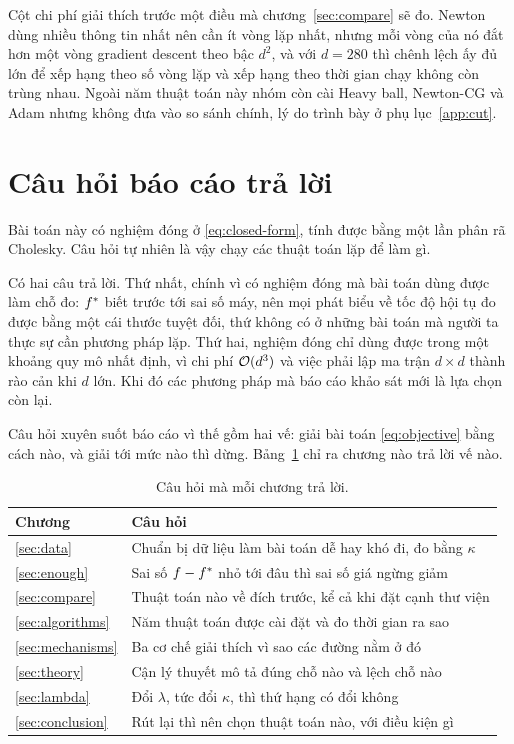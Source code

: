 Cột chi phí giải thích trước một điều mà chương~\ref{sec:compare} sẽ đo. Newton
dùng nhiều thông tin nhất nên cần ít vòng lặp nhất, nhưng mỗi vòng của nó đắt hơn
một vòng gradient descent theo bậc $d^{2}$, và với $d = 280$ thì chênh lệch ấy đủ
lớn để xếp hạng theo số vòng lặp và xếp hạng theo thời gian chạy không còn trùng
nhau. Ngoài năm thuật toán này nhóm còn cài Heavy ball, Newton-CG và Adam nhưng
không đưa vào so sánh chính, lý do trình bày ở phụ lục~\ref{app:cut}.

\section{Câu hỏi báo cáo trả lời}
\label{sec:question}

Bài toán này có nghiệm đóng ở \eqref{eq:closed-form}, tính được bằng một lần phân
rã Cholesky. Câu hỏi tự nhiên là vậy chạy các thuật toán lặp để làm gì.

Có hai câu trả lời. Thứ nhất, chính vì có nghiệm đóng mà bài toán dùng được làm
chỗ đo: $f^{*}$ biết trước tới sai số máy, nên mọi phát biểu về tốc độ hội tụ đo
được bằng một cái thước tuyệt đối, thứ không có ở những bài toán mà người ta thực
sự cần phương pháp lặp. Thứ hai, nghiệm đóng chỉ dùng được trong một khoảng quy
mô nhất định, vì chi phí $\mathcal{O}(d^{3})$ và việc phải lập ma trận $d \times d$
thành rào cản khi $d$ lớn. Khi đó các phương pháp mà báo cáo khảo sát mới là lựa
chọn còn lại.

Câu hỏi xuyên suốt báo cáo vì thế gồm hai vế: giải bài toán \eqref{eq:objective}
bằng cách nào, và giải tới mức nào thì dừng. Bảng~\ref{tab:roadmap} chỉ ra chương
nào trả lời vế nào.

\begin{table}[tp]
  \centering
  \caption{Câu hỏi mà mỗi chương trả lời.}
  \label{tab:roadmap}
  \begin{tabular}{ll}
    \toprule
    Chương & Câu hỏi \\
    \midrule
    \ref{sec:data}       & Chuẩn bị dữ liệu làm bài toán dễ hay khó đi, đo bằng $\kappa$ \\
    \ref{sec:enough}     & Sai số $f - f^{*}$ nhỏ tới đâu thì sai số giá ngừng giảm \\
    \ref{sec:compare}    & Thuật toán nào về đích trước, kể cả khi đặt cạnh thư viện \\
    \ref{sec:algorithms} & Năm thuật toán được cài đặt và đo thời gian ra sao \\
    \ref{sec:mechanisms} & Ba cơ chế giải thích vì sao các đường nằm ở đó \\
    \ref{sec:theory}     & Cận lý thuyết mô tả đúng chỗ nào và lệch chỗ nào \\
    \ref{sec:lambda}     & Đổi $\lambda$, tức đổi $\kappa$, thì thứ hạng có đổi không \\
    \ref{sec:conclusion} & Rút lại thì nên chọn thuật toán nào, với điều kiện gì \\
    \bottomrule
  \end{tabular}
\end{table}

